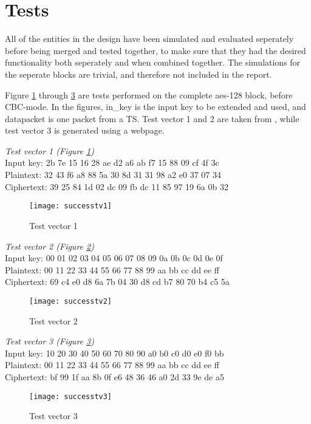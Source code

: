 \section{Tests}
All of the entities in the design have been simulated and evaluated 
seperately before being merged and tested together, to make sure that 
they had the desired functionality both seperately and when combined 
together. The simulations for the seperate blocks are trivial, and 
therefore not included in the report.

Figure \ref{test:1} through \ref{test:3} are tests performed on the 
complete aes-128 block, before CBC-mode. In the figures, in\_key is the 
input key to be extended and used, and datapacket is one packet from a 
TS. Test vector 1 and 2 are taken from \citep{AES:2001}, while test 
vector 3 is generated using a webpage.

\emph{Test vector 1 (Figure \ref{test:1})}\\
Input key: 2b 7e 15 16 28 ae d2 a6 ab f7 15 88 09 cf 4f 3c\\
Plaintext: 32 43 f6 a8 88 5a 30 8d 31 31 98 a2 e0 37 07 34\\
Ciphertext: 39 25 84 1d 02 dc 09 fb dc 11 85 97 19 6a 0b 32

\begin{figure}
  \texttt{[image: successtv1]}
  \caption{Test vector 1}
  \label{test:1}
\end{figure}

\emph{Test vector 2 (Figure \ref{test:2})}\\
Input key: 00 01 02 03 04 05 06 07 08 09 0a 0b 0c 0d 0e 0f\\
Plaintext: 00 11 22 33 44 55 66 77 88 99 aa bb cc dd ee ff\\
Ciphertext: 69 c4 e0 d8 6a 7b 04 30 d8 cd b7 80 70 b4 c5 5a

\begin{figure}
  \texttt{[image: successtv2]}
  \caption{Test vector 2}
  \label{test:2}
\end{figure}

\emph{Test vector 3 (Figure \ref{test:3})} \\
Input key: 10 20 30 40 50 60 70 80 90 a0 b0 c0 d0 e0 f0 bb\\
Plaintext: 00 11 22 33 44 55 66 77 88 99 aa bb cc dd ee ff\\
Ciphertext: bf 99 1f aa 8b 0f e6 48 36 46 a0 2d 33 9e de a5

\begin{figure}
  \texttt{[image: successtv3]}
  \caption{Test vector 3}
  \label{test:3}
\end{figure}

